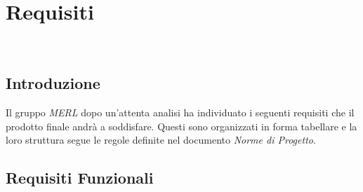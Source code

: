 \chapter{Requisiti}

 \\

\renewcommand\arraystretch{1,5}

\section{Introduzione}
Il gruppo \textit{MERL} dopo un'attenta analisi ha individuato i seguenti requisiti che il prodotto finale andrà a soddisfare. Questi sono organizzati in forma tabellare e la loro struttura segue le regole definite nel documento \textit{Norme di Progetto}.

\section{Requisiti Funzionali}

